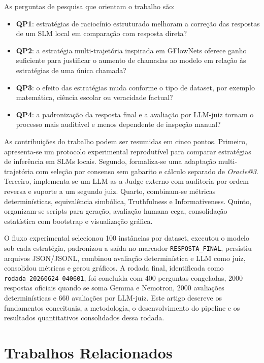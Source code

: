 \documentclass[12pt]{article}
\begin{document}
As perguntas de pesquisa que orientam o trabalho são:

\begin{itemize}
\item \textbf{QP1}: estratégias de raciocínio estruturado melhoram a correção das respostas de um SLM local em comparação com resposta direta?
\item \textbf{QP2}: a estratégia multi-trajetória inspirada em GFlowNets oferece ganho suficiente para justificar o aumento de chamadas ao modelo em relação às estratégias de uma única chamada?
\item \textbf{QP3}: o efeito das estratégias muda conforme o tipo de dataset, por exemplo matemática, ciência escolar ou veracidade factual?
\item \textbf{QP4}: a padronização da resposta final e a avaliação por LLM-juiz tornam o processo mais auditável e menos dependente de inspeção manual?
\end{itemize}

As contribuições do trabalho podem ser resumidas em cinco pontos. Primeiro, apresenta-se um protocolo experimental reprodutível para comparar estratégias de inferência em SLMs locais. Segundo, formaliza-se uma adaptação multi-trajetória com seleção por consenso sem gabarito e cálculo separado de \textit{Oracle@3}. Terceiro, implementa-se um LLM-as-a-Judge externo com auditoria por ordem reversa e suporte a um segundo juiz. Quarto, combinam-se métricas determinísticas, equivalência simbólica, Truthfulness e Informativeness. Quinto, organizam-se scripts para geração, avaliação humana cega, consolidação estatística com bootstrap e visualização gráfica.

O fluxo experimental selecionou 100 instâncias por dataset, executou o modelo sob cada estratégia, padronizou a saída no marcador \texttt{RESPOSTA\_FINAL}, persistiu arquivos JSON/JSONL, combinou avaliação determinística e LLM como juiz, consolidou métricas e gerou gráficos. A rodada final, identificada como \texttt{rodada\_20260624\_040601}, foi concluída com 400 perguntas congeladas, 2000 respostas oficiais quando se soma Gemma e Nemotron, 2000 avaliações determinísticas e 660 avaliações por LLM-juiz. Este artigo descreve os fundamentos conceituais, a metodologia, o desenvolvimento do pipeline e os resultados quantitativos consolidados dessa rodada.


\section{Trabalhos Relacionados}
\end{document}
